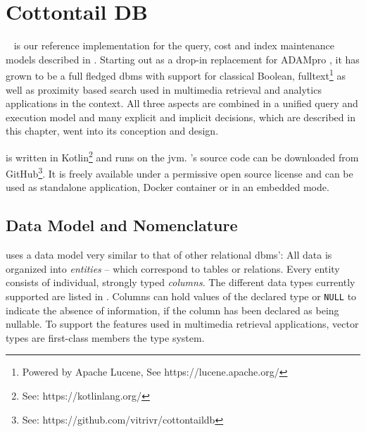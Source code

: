 \chapter{Cottontail DB}

\label{chapter:cottontaildb}

\cottontail{}~\cite{Gasser:2020Cottontail} is our reference implementation for the query, cost and index maintenance models described in . Starting out as a drop-in replacement for ADAMpro \cite{Giangreco:2016Adam}, it has grown to be a full fledged \acrshort{dbms} with support for classical Boolean, fulltext\footnote{Powered by Apache Lucene, See https://lucene.apache.org/} as well as proximity based search used in multimedia retrieval and analytics applications in the \vitrivr{} \cite{Rossetto:2016Vitrivr,Gasser:2019Multimodal} context. All three aspects are combined in a unified query and execution model and many explicit and implicit decisions, which are described in this chapter, went into its conception and design.

\cottontail{} is written in Kotlin\footnote{See: https://kotlinlang.org/} and runs on the \acrfull{jvm}. \cottontail{}'s source code can be downloaded from GitHub\footnote{See: https://github.com/vitrivr/cottontaildb}. It is freely available under a permissive open source license and can be used as standalone application, Docker container or in an embedded mode.

\section{Data Model and Nomenclature} 

\cottontail{} uses a data model very similar to that of other relational \acrshort{dbms}': All data is organized into \emph{entities} -- which correspond to tables or relations. Every entity consists of individual, strongly typed \emph{columns}. The different data types currently supported are listed in . Columns can hold values of the declared type or \texttt{NULL} to indicate the absence of information, if the column has been declared as being nullable. To support the features used in multimedia retrieval applications, vector types are first-class members the type system.

